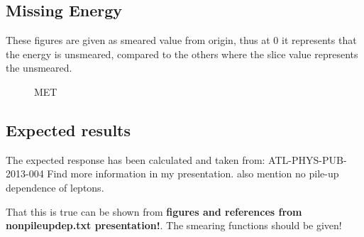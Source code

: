 \subsection{Missing Energy}
These figures are given as smeared value from origin, thus at 0 it represents that the energy is unsmeared, compared to the others where the slice value represents the unsmeared. 
 \begin{figure}[H] %
    \hfill
        \hfill
   \caption{MET}
    \label{fig:MET}
  \end{figure}

\subsection{Expected results}\label{cha:vali:sec:results:subsec:expr}

The expected response has been calculated and taken from: ATL-PHYS-PUB-2013-004
Find more information in my presentation. also mention no pile-up dependence of leptons.


That this is true can be shown from \textbf{figures and references from nonpileupdep.txt presentation!}. The smearing functions should be given! 

